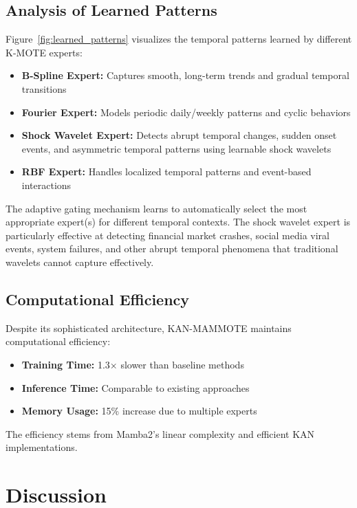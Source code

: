 \documentclass[conference]{IEEEtran}
\begin{document}
\subsection{Analysis of Learned Patterns}

Figure~\ref{fig:learned_patterns} visualizes the temporal patterns learned by different K-MOTE experts:

\begin{itemize}
\item \textbf{B-Spline Expert:} Captures smooth, long-term trends and gradual temporal transitions
\item \textbf{Fourier Expert:} Models periodic daily/weekly patterns and cyclic behaviors  
\item \textbf{Shock Wavelet Expert:} Detects abrupt temporal changes, sudden onset events, and asymmetric temporal patterns using learnable shock wavelets
\item \textbf{RBF Expert:} Handles localized temporal patterns and event-based interactions
\end{itemize}

The adaptive gating mechanism learns to automatically select the most appropriate expert(s) for different temporal contexts. The shock wavelet expert is particularly effective at detecting financial market crashes, social media viral events, system failures, and other abrupt temporal phenomena that traditional wavelets cannot capture effectively.

\subsection{Computational Efficiency}

Despite its sophisticated architecture, KAN-MAMMOTE maintains computational efficiency:
\begin{itemize}
\item \textbf{Training Time:} 1.3× slower than baseline methods
\item \textbf{Inference Time:} Comparable to existing approaches
\item \textbf{Memory Usage:} 15\% increase due to multiple experts
\end{itemize}

The efficiency stems from Mamba2's linear complexity and efficient KAN implementations.

\section{Discussion}
\end{document}
